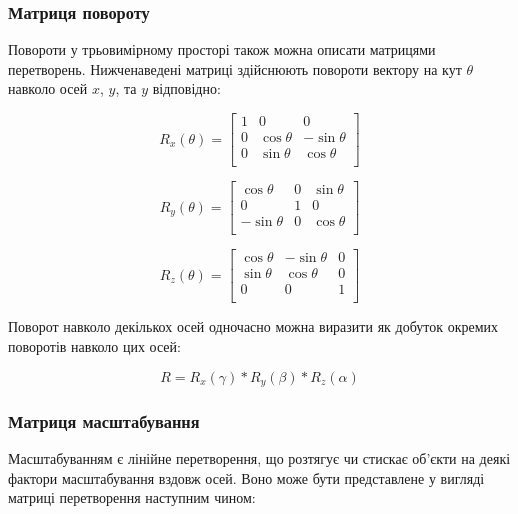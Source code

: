 \subsubsection{Матриця повороту}

Повороти у трьовимірному просторі також можна описати матрицями перетворень. Нижченаведені матриці здійснюють повороти вектору на кут $\theta$ навколо осей $x$, $y$, та $y$ відповідно:

\begin{equation}
  R_x(\theta) = \begin{bmatrix}
    1 & 0 & 0 \\
    0 & \cos \theta &  -\sin \theta \\[3pt]
    0 & \sin \theta  &  \cos \theta \\[3pt]
  \end{bmatrix}
\end{equation}

\begin{equation}
  R_y(\theta) = \begin{bmatrix}
    \cos \theta & 0 & \sin \theta \\[3pt]
    0 & 1 & 0 \\[3pt]
    -\sin \theta & 0 & \cos \theta \\
  \end{bmatrix}
\end{equation}

\begin{equation}
  R_z(\theta) = \begin{bmatrix}
    \cos \theta &  -\sin \theta & 0 \\[3pt]
    \sin \theta & \cos \theta & 0\\[3pt]
    0 & 0 & 1\\
  \end{bmatrix}
\end{equation}

Поворот навколо декількох осей одночасно можна виразити як добуток окремих поворотів навколо цих осей:

\begin{equation}
  R = R_x(\gamma) * R_y(\beta) * R_z(\alpha)
\end{equation}

\subsubsection{Матриця масштабування}

Масштабуванням є лінійне перетворення, що розтягує чи стискає об'єкти на деякі фактори масштабування вздовж осей. Воно може бути представлене у вигляді матриці перетворення наступним чином:

